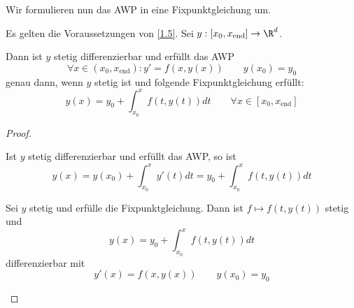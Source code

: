 \documentclass[
]{mycourse}
\begin{document}
Wir formulieren nun das AWP in eine Fixpunktgleichung um.

\begin{lem} \label{1.9}
	Es gelten die Voraussetzungen von \ref{1.5}.
	Sei $y:[x_0,x_{\text{end}}] \to \R^d$.

	Dann ist $y$ stetig differenzierbar und erfüllt das AWP
	\[
		\forall x \in (x_0,x_{\text{end}}): y'=f(x,y(x))  \qquad y(x_0) = y_0
	\]
	genau dann, wenn $y$ stetig ist und folgende Fixpunktgleichung erfüllt:
	\[
		y(x) = y_0 + \int_{x_0}^{x} f(t, y(t)) dt
		\qquad \forall x \in [x_0,x_{\text{end}}]
	\]
	\begin{proof}
		\begin{seg}[$\implies$]
			Ist $y$ stetig differenzierbar und erfüllt das AWP, so ist
			\[
				y(x) = y(x_0) + \int_{x_0}^x y'(t) dt = y_0 + \int_{x_0}^x f(t,y(t)) dt
			\]
		\end{seg}
		\begin{seg}[$\Longleftarrow$]
			Sei $y$ stetig und erfülle die Fixpunktgleichung.
			Dann ist $f \mapsto f(t, y(t))$ stetig und
			\[
				y(x) = y_0 + \int_{x_0}^x f(t,y(t)) dt
			\]
			differenzierbar mit
			\[
				y'(x) = f(x,y(x))
				\qquad y(x_0) = y_0
			\]
		\end{seg}
	\end{proof}
\end{lem}
\end{document}
